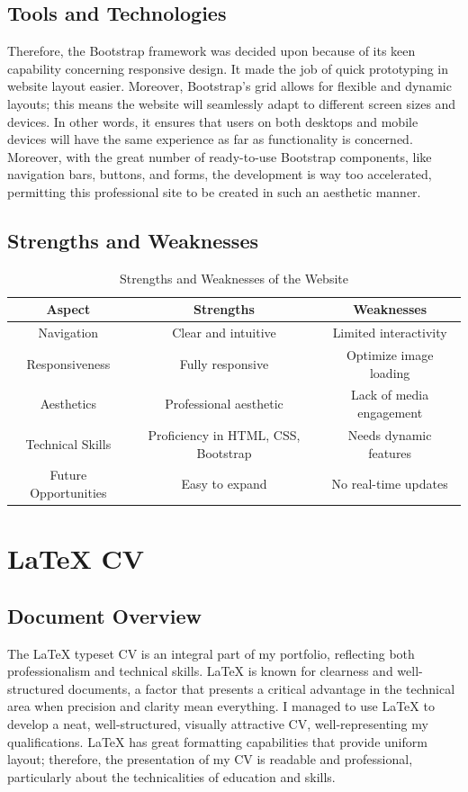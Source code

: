 \documentclass[a4paper,12pt]{article}
\begin{document}
\subsection{Tools and Technologies}
Therefore, the Bootstrap framework was decided upon because of its keen capability concerning responsive design. It made the job of quick prototyping in website layout easier. Moreover, Bootstrap's grid allows for flexible and dynamic layouts; this means the website will seamlessly adapt to different screen sizes and devices. In other words, it ensures that users on both desktops and mobile devices will have the same experience as far as functionality is concerned. Moreover, with the great number of ready-to-use Bootstrap components, like navigation bars, buttons, and forms, the development is way too accelerated, permitting this professional site to be created in such an aesthetic manner.

\subsection{Strengths and Weaknesses}

\begin{table}[h!]
\centering
\begin{tabular}{|c|c|c|}
\hline
\textbf{Aspect} & \textbf{Strengths} & \textbf{Weaknesses} \\ \hline
Navigation & Clear and intuitive & Limited interactivity \\ \hline
Responsiveness & Fully responsive & Optimize image loading \\ \hline
Aesthetics & Professional aesthetic & Lack of media engagement \\ \hline
Technical Skills & Proficiency in HTML, CSS, Bootstrap & Needs dynamic features \\ \hline
Future Opportunities & Easy to expand & No real-time updates \\ \hline
\end{tabular}
\caption{Strengths and Weaknesses of the Website}
\end{table}

\section{LaTeX CV}

\subsection{Document Overview}
The LaTeX typeset CV is an integral part of my portfolio, reflecting both professionalism and technical skills. LaTeX is known for clearness and well-structured documents, a factor that presents a critical advantage in the technical area when precision and clarity mean everything. I managed to use LaTeX to develop a neat, well-structured, visually attractive CV, well-representing my qualifications. LaTeX has great formatting capabilities that provide uniform layout; therefore, the presentation of my CV is readable and professional, particularly about the technicalities of education and skills.
\end{document}
